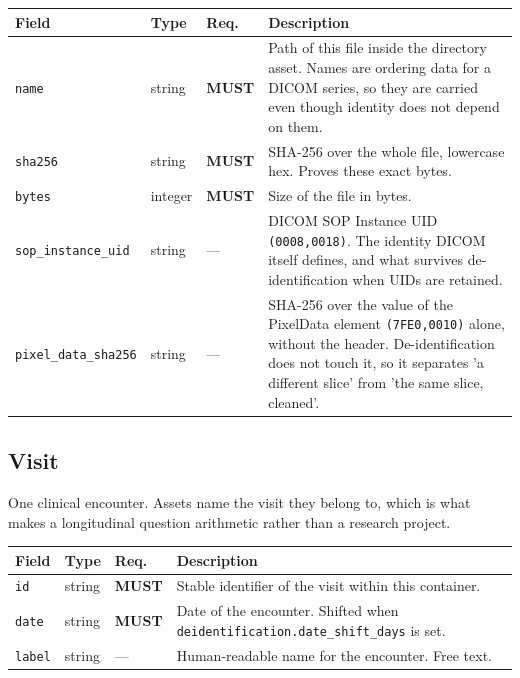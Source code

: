 \documentclass[11pt,a4paper]{article}
\newcommand{\MUST}{\textcolor{uosred}{\textbf{MUST}}}
\newcommand{\code}[1]{\texttt{\small #1}}
\begin{document}
\begin{longtable}{L{3.5cm} L{3.0cm} C{1.4cm} L{6.4cm}}
\toprule
\textbf{Field} & \textbf{Type} & \textbf{Req.} & \textbf{Description}\\
\midrule
\endhead
\code{name} & string & \MUST{} & Path of this file inside the directory asset. Names are ordering data for a DICOM series, so they are carried even though identity does not depend on them.\\
\code{sha256} & string & \MUST{} & SHA-256 over the whole file, lowercase hex. Proves these exact bytes.\\
\code{bytes} & integer & \MUST{} & Size of the file in bytes.\\
\code{sop\_instance\_uid} & string & --- & DICOM SOP Instance UID \code{(0008,0018)}. The identity DICOM itself defines, and what survives de-identification when UIDs are retained.\\
\code{pixel\_data\_sha256} & string & --- & SHA-256 over the value of the PixelData element \code{(7FE0,0010)} alone, without the header. De-identification does not touch it, so it separates 'a different slice' from 'the same slice, cleaned'.\\
\bottomrule
\end{longtable}

\subsection{Visit}

One clinical encounter. Assets name the visit they belong to, which is what makes a longitudinal question arithmetic rather than a research project.

\begin{longtable}{L{3.5cm} L{3.0cm} C{1.4cm} L{6.4cm}}
\toprule
\textbf{Field} & \textbf{Type} & \textbf{Req.} & \textbf{Description}\\
\midrule
\endhead
\code{id} & string & \MUST{} & Stable identifier of the visit within this container.\\
\code{date} & string & \MUST{} & Date of the encounter. Shifted when \code{deidentification.date\_shift\_days} is set.\\
\code{label} & string & --- & Human-readable name for the encounter. Free text.\\
\bottomrule
\end{longtable}
\end{document}
